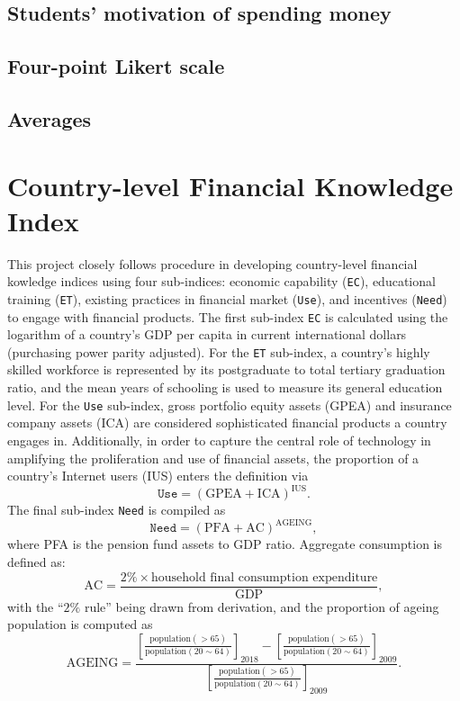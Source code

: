 \documentclass[a4paper,11pt,UKenglish,twoside,openright]{report}\usepackage[]{graphicx}\usepackage[]{color}
\begin{document}
\subsection{Students' motivation of spending money}

\subsection{Four-point Likert scale}

\subsection{Averages}

\newpage

\section{Country-level Financial Knowledge Index}

This project closely follows  procedure in developing country-level financial kowledge indices using four sub-indices: economic capability (\texttt{EC}), educational training (\texttt{ET}), existing practices in financial market (\texttt{Use}), and incentives (\texttt{Need}) to engage with financial products. The first sub-index \texttt{EC} is calculated using the logarithm of a country's GDP per capita in current international dollars (purchasing power parity adjusted). For the \texttt{ET} sub-index, a country's highly skilled workforce is represented by its postgraduate to total tertiary graduation ratio, and the mean years of schooling is used to measure its general education level. For the \texttt{Use} sub-index, gross portfolio equity assets (GPEA) and insurance company assets (ICA) are considered sophisticated financial products a country engages in. Additionally, in order to capture the central role of technology in amplifying the proliferation and use of financial assets, the proportion of a country's Internet users (\textsc{IUS}) enters the definition via
\[ \texttt{Use} = ( \text{GPEA} + \text{ICA} ) ^ \text{IUS}. \]
The final sub-index \texttt{Need} is compiled as
\[ \texttt{Need} = ( \text{PFA} + \text{AC} ) ^ \text{AGEING}, \]
where \textsc{PFA} is the pension fund assets to GDP ratio. Aggregate consumption is defined as:
\[ \text{AC} = \frac{2\% \times \text{household final consumption expenditure}}{\text{GDP}}, \]
with the ``$2\%$ rule'' being drawn from  derivation, and the proportion of ageing population is computed as
\[ \text{AGEING} = \frac{ \left[ \frac{\text{population}(>65)}{\text{population}(20 \sim 64)} \right]_{2018} - \left[ \frac{\text{population}(>65)}{\text{population}(20 \sim 64)} \right]_{2009} }{ \left[ \frac{\text{population}(>65)}{\text{population}(20 \sim 64)} \right]_{2009} }. \]
\end{document}
